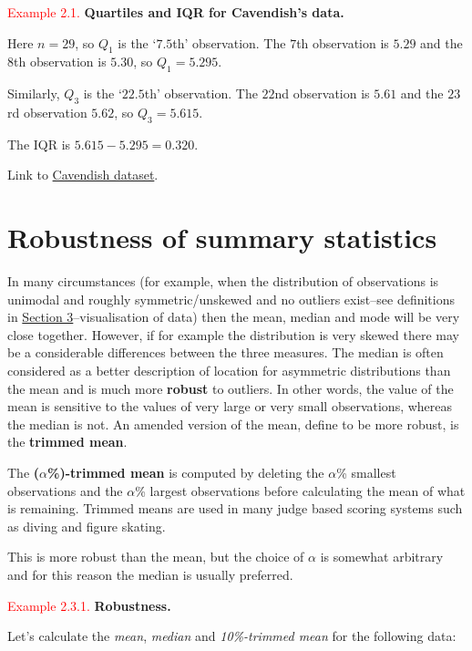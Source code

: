 \documentclass[
]{book}
\begin{document}
\leavevmode{}%
\textcolor{red}{Example 2.1.}
{\textbf{Quartiles and IQR for Cavendish's data.}}

Here \(n = 29\), so \(Q_1\) is the `\(7.5\)th' observation. The \(7\)th
observation is \(5.29\) and the \(8\)th observation is \(5.30\),
so \(Q_1 = 5.295\).

Similarly, \(Q_3\) is the `\(22.5\)th' observation. The \(22\)nd
observation is \(5.61\) and the \(23\)rd observation \(5.62\),
so \(Q_3 = 5.615\).

The IQR is \(5.615 - 5.295 = 0.320\).

Link to \protect\hyperlink{intro_example}{Cavendish dataset}.

\hypertarget{summary_robust}{%
\section{Robustness of summary statistics}\label{summary_robust}}

In many circumstances (for example, when the distribution of
observations is unimodal and roughly symmetric/unskewed and no outliers
exist--see definitions in
\protect\hyperlink{visual}{Section 3}--visualisation of data) then the mean, median and mode will be
very close together. However, if for example the distribution is very
skewed there may be a considerable differences between the three
measures. The median is often considered as a better description of
location for asymmetric distributions than the mean and is much more
\textbf{robust} to outliers. In other words, the value of the mean is
sensitive to the values of very large or very small observations,
whereas the median is not. An amended version of the mean, define to be
more robust, is the \textbf{trimmed mean}.

The \textbf{(\(\alpha\)\%)-trimmed mean} is computed by deleting the \(\alpha\)\%
smallest observations and the \(\alpha\)\% largest observations before
calculating the mean of what is remaining. Trimmed means are used in many judge based scoring systems such as diving and figure skating.

This is more robust than the mean, but the choice of \(\alpha\) is
somewhat arbitrary and for this reason the median is usually preferred.

\leavevmode{}%
\textcolor{red}{Example 2.3.1.}
{\textbf{Robustness.}}

Let's calculate the \emph{mean}, \emph{median} and \emph{10\%-trimmed mean}
for the following data:
\end{document}
